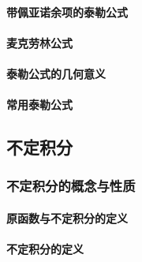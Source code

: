 \documentclass[
]{article}
\begin{document}
\hypertarget{ux5e26ux4f69ux4e9aux8bfaux4f59ux9879ux7684ux6cf0ux52d2ux516cux5f0f}{%
\paragraph{带佩亚诺余项的泰勒公式}\label{ux5e26ux4f69ux4e9aux8bfaux4f59ux9879ux7684ux6cf0ux52d2ux516cux5f0f}}

\hypertarget{ux9ea6ux514bux52b3ux6797ux516cux5f0f}{%
\paragraph{麦克劳林公式}\label{ux9ea6ux514bux52b3ux6797ux516cux5f0f}}

\hypertarget{ux6cf0ux52d2ux516cux5f0fux7684ux51e0ux4f55ux610fux4e49}{%
\paragraph{泰勒公式的几何意义}\label{ux6cf0ux52d2ux516cux5f0fux7684ux51e0ux4f55ux610fux4e49}}

\hypertarget{ux5e38ux7528ux6cf0ux52d2ux516cux5f0f}{%
\paragraph{常用泰勒公式}\label{ux5e38ux7528ux6cf0ux52d2ux516cux5f0f}}

\hypertarget{ux4e0dux5b9aux79efux5206}{%
\subsection{不定积分}\label{ux4e0dux5b9aux79efux5206}}

\hypertarget{ux4e0dux5b9aux79efux5206ux7684ux6982ux5ff5ux4e0eux6027ux8d28}{%
\subsubsection{不定积分的概念与性质}\label{ux4e0dux5b9aux79efux5206ux7684ux6982ux5ff5ux4e0eux6027ux8d28}}

\hypertarget{ux539fux51fdux6570ux4e0eux4e0dux5b9aux79efux5206ux7684ux5b9aux4e49}{%
\paragraph{原函数与不定积分的定义}\label{ux539fux51fdux6570ux4e0eux4e0dux5b9aux79efux5206ux7684ux5b9aux4e49}}

\hypertarget{ux4e0dux5b9aux79efux5206ux7684ux5b9aux4e49}{%
\paragraph{不定积分的定义}\label{ux4e0dux5b9aux79efux5206ux7684ux5b9aux4e49}}
\end{document}
